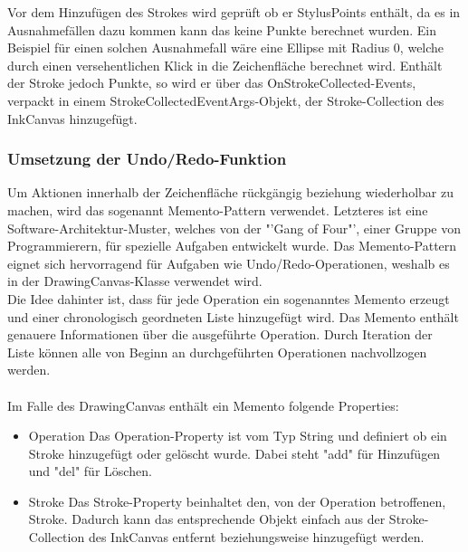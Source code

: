 Vor dem Hinzufügen des Strokes wird geprüft ob er StylusPoints enthält, da es in Ausnahmefällen dazu kommen kann das keine Punkte berechnet wurden. Ein Beispiel für einen solchen Ausnahmefall wäre eine Ellipse mit Radius 0, welche durch einen versehentlichen Klick in die Zeichenfläche berechnet wird. Enthält der Stroke jedoch Punkte, so wird er über das OnStrokeCollected-Events, verpackt in einem StrokeCollectedEventArgs-Objekt, der Stroke-Collection des InkCanvas hinzugefügt. 

\subsubsection{Umsetzung der Undo/Redo-Funktion}
Um Aktionen innerhalb der Zeichenfläche rückgängig beziehung wiederholbar zu machen, wird das sogenannt Memento-Pattern verwendet. Letzteres ist eine Software-Architektur-Muster, welches von der "'Gang of Four"', einer Gruppe von Programmierern, für spezielle Aufgaben entwickelt wurde. Das Memento-Pattern eignet sich hervorragend für Aufgaben wie Undo/Redo-Operationen, weshalb es in der DrawingCanvas-Klasse verwendet wird.\\
Die Idee dahinter ist, dass für jede Operation ein sogenanntes Memento erzeugt und einer chronologisch geordneten Liste hinzugefügt wird. Das Memento enthält genauere Informationen über die ausgeführte Operation. Durch Iteration der Liste können alle von Beginn an durchgeführten Operationen nachvollzogen werden.\\
\\
Im Falle des DrawingCanvas enthält ein Memento folgende Properties:
\begin{itemize}
\item Operation
Das Operation-Property ist vom Typ String und definiert ob ein Stroke hinzugefügt oder gelöscht wurde. Dabei steht "add" für Hinzufügen und "del" für Löschen.
\item Stroke
Das Stroke-Property beinhaltet den, von der Operation betroffenen, Stroke. Dadurch kann das entsprechende Objekt einfach aus der Stroke-Collection des InkCanvas entfernt beziehungsweise hinzugefügt werden.
\end{itemize}

